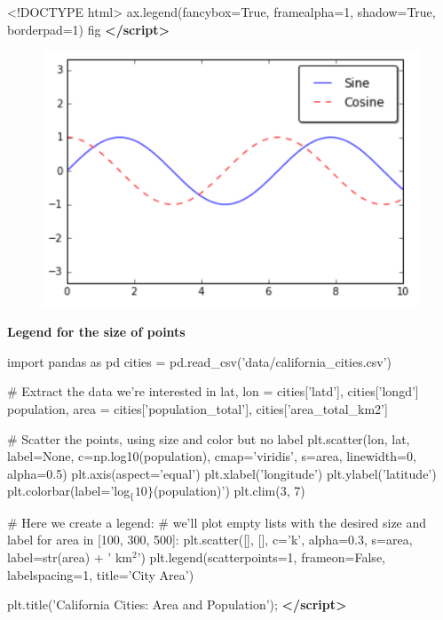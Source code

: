 \documentclass[]{book}
\newenvironment{Shaded}{\begin{snugshade}}{\end{snugshade}}
\newcommand{\KeywordTok}[1]{\textcolor[rgb]{0.13,0.29,0.53}{\textbf{#1}}}
\newcommand{\DataTypeTok}[1]{\textcolor[rgb]{0.13,0.29,0.53}{#1}}
\newcommand{\NormalTok}[1]{#1}
\begin{document}
\begin{Shaded}
\begin{Highlighting}[]
\DataTypeTok{<!DOCTYPE }\NormalTok{html}\DataTypeTok{>}
\NormalTok{ax.legend(fancybox=True, framealpha=1, shadow=True, borderpad=1)}
\NormalTok{fig}
\KeywordTok{</script>}
\end{Highlighting}
\end{Shaded}

\begin{figure}
\centering
\includegraphics{images/legend3.png}
\caption{}
\end{figure}

\textbf{Legend for the size of points}

\begin{Shaded}
\begin{Highlighting}[]
\NormalTok{import pandas as pd}
\NormalTok{cities = pd.read_csv('data/california_cities.csv')}

\NormalTok{# Extract the data we're interested in}
\NormalTok{lat, lon = cities['latd'], cities['longd']}
\NormalTok{population, area = cities['population_total'], cities['area_total_km2']}

\NormalTok{# Scatter the points, using size and color but no label}
\NormalTok{plt.scatter(lon, lat, label=None,}
\NormalTok{            c=np.log10(population), cmap='viridis',}
\NormalTok{            s=area, linewidth=0, alpha=0.5)}
\NormalTok{plt.axis(aspect='equal')}
\NormalTok{plt.xlabel('longitude')}
\NormalTok{plt.ylabel('latitude')}
\NormalTok{plt.colorbar(label='log$_\{10\}$(population)')}
\NormalTok{plt.clim(3, 7)}

\NormalTok{# Here we create a legend:}
\NormalTok{# we'll plot empty lists with the desired size and label}
\NormalTok{for area in [100, 300, 500]:}
\NormalTok{    plt.scatter([], [], c='k', alpha=0.3, s=area,}
\NormalTok{                label=str(area) + ' km$^2$')}
\NormalTok{plt.legend(scatterpoints=1, frameon=False, labelspacing=1, title='City Area')}

\NormalTok{plt.title('California Cities: Area and Population');}
\KeywordTok{</script>}
\end{Highlighting}
\end{Shaded}
\end{document}
